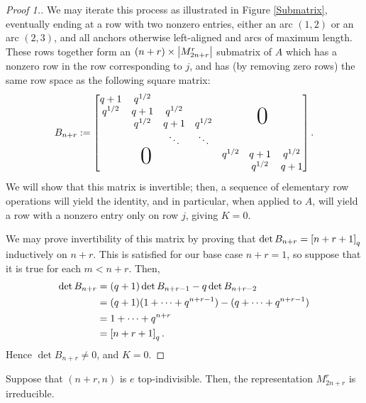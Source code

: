 \documentclass{amsart}
\begin{document}
\begin{proof}[Proof 1.]
  We may iterate this process as illustrated in Figure \ref{Submatrix}, eventually ending at a row with two nonzero entries, either an arc $(1,2)$ or an arc $(2,3)$, and all anchors otherwise left-aligned and arcs of maximum length.
  These rows together form an $(n + r) \times \left| M_{2n + r}^r \right|$ submatrix of $A$ which has a nonzero row in the row corresponding to $j$, and has (by removing zero rows) the same row space as the following square matrix:
  \newcommand*\bigzero{\makebox(0,15){\text{\Huge0}}}
  \newcommand*\bigzerotwo{\makebox(-20,15){\text{\Huge0}}}
  \begin{equation}\label{Bnr}
    B_{n + r} := \begin{bmatrix}
      \begin{matrix}
      q + 1 & q^{1/2} & \\
      q^{1/2} & q + 1 & q^{1/2}\\
      & q^{1/2} & q + 1 & q^{1/2}\\
      &  & \ddots & \ddots
      \end{matrix}
      &   \bigzero\\
      \bigzerotwo & \begin{matrix}
        q^{1/2} & q+1 & q^{1/2}\\
        &  q^{1/2} & q + 1
       \end{matrix}
    \end{bmatrix}.
  \end{equation}
  We will show that this matrix is invertible;
  then, a sequence of elementary row operations will yield the identity, and in particular, when applied to $A$, will yield a row with a nonzero entry only on row $j$, giving $K = 0$.

  We may prove invertibility of this matrix by proving that $\det B_{n + r} = \left[ n + r + 1 \right]_q$ inductively on $n+r$.
  This is satisfied for our base case $n + r = 1$, so suppose that it is true for each $m < n + r$.
  Then,
  \begin{align*}
    \det B_{n+r} &= (q + 1) \det B_{n + r - 1} - q \det B_{n + r - 2}\\
    &= (q + 1)(1 + \dots + q^{n + r - 1}) - (q + \dots + q^{n + r - 1})\\
    &= 1 + \dots + q^{n + r}\\
    &= \left[ n + r + 1 \right]_q.
  \end{align*}
  Hence $\det B_{n + r} \neq 0$, and $K = 0$.
\end{proof}
\begin{proposition}
  Suppose that $(n+r,n)$ is $e$ top-indivisible.
  Then, the representation $M_{2n + r}^r$ is irreducible. 
\end{proposition}
\end{document}
